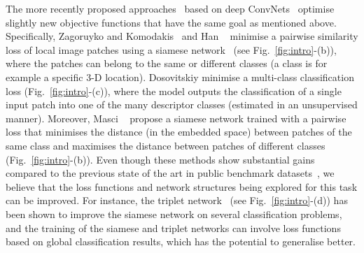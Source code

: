 \documentclass[10pt,twocolumn,letterpaper]{article}
\begin{document}
The more recently proposed approaches~\cite{dosovitskiy2014discriminative,Han_cvpr15,masci2014descriptor,ZagoruykoCVPR15} based on deep ConvNets~\cite{krizhevsky2012imagenet} optimise slightly new objective functions that have the same goal as mentioned above.
Specifically, Zagoruyko and Komodakis~\cite{ZagoruykoCVPR15} and Han \etal~\cite{Han_cvpr15}  minimise a pairwise similarity loss of local image patches using a siamese network~\cite{bromley1993signature} (see Fig.~\ref{fig:intro}-(b)), where the patches can belong to the same or different classes (a class is for example a specific 3-D location).
Dosovitskiy \etal\cite{dosovitskiy2014discriminative} minimise a multi-class classification loss (Fig.~\ref{fig:intro}-(c)), where the model outputs the classification of a single input patch into one of the many descriptor classes (estimated in an unsupervised manner).
Moreover, Masci \etal~\cite{masci2014descriptor} propose a siamese network trained with a pairwise loss that minimises the distance (in the embedded space) between patches of the same class and maximises the distance between patches of different classes (Fig.~\ref{fig:intro}-(b)).
Even though these methods show substantial gains compared to the previous state of the art in public benchmark datasets~\cite{brownpami10,carneiro2010automatic,chen2005local,niyogi2004locality,Simonyanpami14,sugiyama2007dimensionality,trzcinski2013boosting}, we believe that the loss functions and network structures being explored for this task can be improved.  For instance,  the triplet network~\cite{Wangcvpr14,hoffer2014deep,SchroffKPcvpr15,wohlhartcvpr15} (see Fig.~\ref{fig:intro}-(d)) has been shown to improve  the siamese network on several classification problems, and the training of the siamese and triplet networks can involve loss functions based on global classification results, which has the potential to generalise better.
\end{document}
